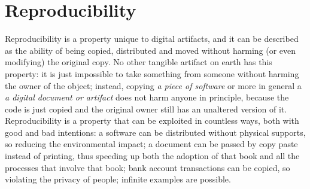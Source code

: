 \documentclass{article}
\begin{document}
	\section{Reproducibility}
		Reproducibility is a property unique to digital artifacts, and it can be described as the ability of being copied, distributed and moved without harming (or even modifying) the original copy. No other tangible artifact on earth has this property: it is just impossible to take something from someone without harming the owner of the object; instead, copying \textit{a piece of software} or more in general a \textit{a digital document or artifact} does not harm anyone in principle, because the code is just copied and the original owner still has an unaltered version of it. Reproducibility is a property that can be exploited in countless ways, both with good and bad intentions: a software can be distributed without physical supports, so reducing the environmental impact; a document can be passed by copy paste instead of printing, thus speeding up both the adoption of that book and all the processes that involve that book; bank account transactions can be copied, so violating the privacy of people; infinite examples are possible.
		
\end{document}
